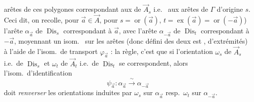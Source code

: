 \documentclass[11pt,a4paper]{article}
\begin{document}
arêtes de ces polygones correspondant aux   de $\vec{A}_s$ i.e.\  aux arêtes de $\Gamma$ d'origine $s$. Ceci dit, on recolle, pour $\vec{a} \in \vec{A}$,  pour $s = \operatorname{or}(\vec{a})$, $t = \operatorname{ex}(\vec{a}) = \operatorname{or}(-\vec{a})$)  l'arête $\alpha_{\vec{a}}$ de $\operatorname{Dis}_s$ correspondant à $\vec{a}$, avec l'arête $\alpha_{-\vec{a}}$ de $\operatorname{Dis}_t$ correspondant à $-\vec{a}$, moyennant un isom.\   sur les arêtes (donc défini \struck{\ill{}}  \struck{\ill{} \ill{}}  des deux est , d'extrémités) \struck{\ill{} \ill{} \ill{}} à l'aide de l'isom.\ de transport $\varphi_{\vec{a}}$ : la règle, c'est que si l'orientation $\omega_s$ de $\vec{A}_s$ i.e.\ de $\operatorname{Dis}_s$ et $\omega_t$ de $\vec{A}_t$ i.e.\ de $\operatorname{Dis}_t$ se correspondent, alors l'isom.\ d'identification
\[
\psi_{\vec{a}} : \alpha_{\vec{a}} \xrightarrow{\ \sim\ } \alpha_{-\vec{a}}
\]
doit \struck{\ill{}} \emph{renverser} les orientations induites par $\omega_s$ sur $\alpha_{\vec{a}}$ resp.\ $\omega_t$ sur $\alpha_{-\vec{a}}$.
\end{document}
